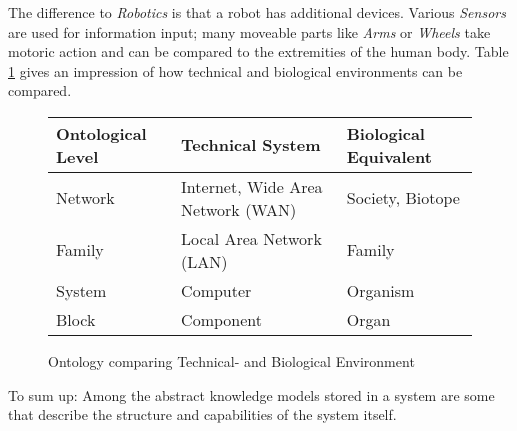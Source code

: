 The difference to \emph{Robotics} is that a robot has additional devices.
Various \emph{Sensors} are used for information input; many moveable parts like
\emph{Arms} or \emph{Wheels} take motoric action and can be compared to the
extremities of the human body. Table \ref{environment_table} gives an
impression of how technical and biological environments can be compared.

\begin{figure}[ht]
    \begin{center}
        \begin{footnotesize}
        \begin{tabular}{| p{25mm} | p{50mm} | p{30mm} |}
            \hline
            \textbf{Ontological Level} & \textbf{Technical System} & \textbf{Biological Equivalent}\\
            \hline
            Network & Internet, Wide Area Network (WAN) & Society, Biotope\\
            \hline
            Family & Local Area Network (LAN) & Family\\
            \hline
            System & Computer & Organism\\
            \hline
            Block & Component & Organ\\
            \hline
        \end{tabular}
        \end{footnotesize}
        \caption{Ontology comparing Technical- and Biological Environment}
        \label{environment_table}
    \end{center}
\end{figure}

To sum up: Among the abstract knowledge models stored in a system are some that
describe the structure and capabilities of the system itself.
